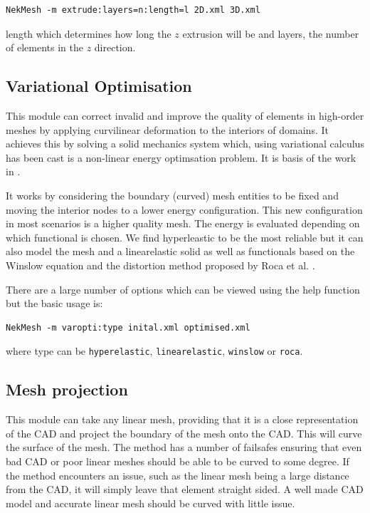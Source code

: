 \begin{lstlisting}[style=BashInputStyle]
  NekMesh -m extrude:layers=n:length=l 2D.xml 3D.xml
\end{lstlisting}

length which determines how long the $z$ extrusion will be and layers, the
number of elements in the $z$ direction.

\subsection{Variational Optimisation}
\label{sec:varopti}
This module can correct invalid and improve the quality of elements in
high-order meshes by applying curvilinear deformation to the interiors of
domains. It achieves this by solving a solid mechanics system which, using
variational calculus has been cast is a non-linear energy optimsation problem.
It is basis of the work in \cite{TuPeMo16}.

It works by considering the boundary (curved) mesh entities to be fixed and
moving the interior nodes to a lower  energy configuration. This new
configuration in most scenarios is a higher quality mesh. The energy is
evaluated depending on which functional is chosen. We find hyperleastic to be
the most reliable but it can also model the mesh and a linearelastic solid as
well as functionals based on the Winslow equation and the distortion method
proposed by Roca et al. \cite{GaRoPeSa15}.

There are a large number of options which can be viewed using the help function
but the basic usage is:
\begin{lstlisting}[style=BashInputStyle]
  NekMesh -m varopti:type inital.xml optimised.xml
\end{lstlisting}

where type can be \texttt{hyperelastic}, \texttt{linearelastic},
\texttt{winslow} or \texttt{roca}.

\subsection{Mesh projection}
This module can take any linear mesh, providing that it is a close
representation of the CAD and project the boundary of the mesh onto the CAD.
This will curve the surface of the mesh. The method has a number of failsafes
ensuring that even bad CAD or poor linear meshes should be able to be curved to
some degree. If the method encounters an issue, such as the linear mesh being a
large distance from the CAD, it will simply leave that element straight sided. A
well made CAD model and accurate linear mesh should be curved with little issue.


